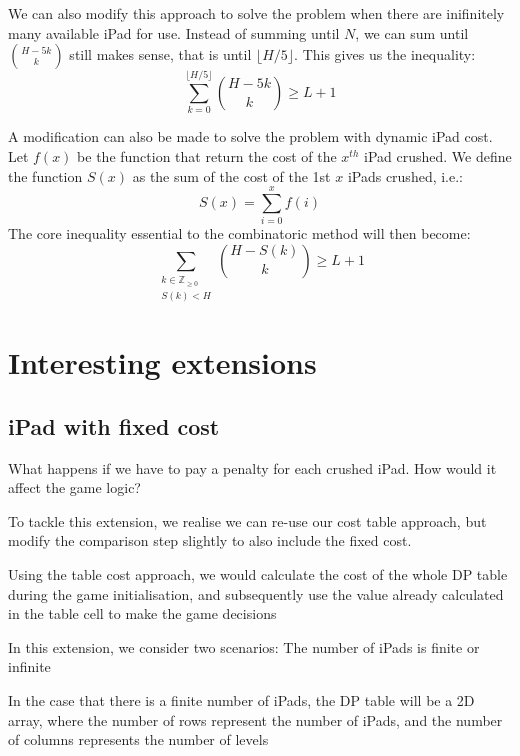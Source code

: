 \documentclass[12pt,a4paper,oneside]{report}
\begin{document}
We can also modify this approach to solve the problem when there are inifinitely many available iPad for use. Instead of summing until $N$, we can sum until ${H-5k \choose k}$ still makes sense, that is until $\lfloor H/5 \rfloor$. This gives us the inequality: \[\sum_{k=0}^{\lfloor H/5 \rfloor} {H-5k \choose k} \geq L+1\]

A modification can also be made to solve the problem with dynamic iPad cost. Let $f(x)$ be the function that return the cost of the $x^{th}$ iPad crushed. We define the function $S(x)$ as the sum of the cost of the 1st $x$ iPads crushed, i.e.: \[S(x) = \sum_{i=0}^x f(i)\] The core inequality essential to the combinatoric method will then become: \[\sum_{\substack{k \in \mathbb{Z}_{\geq 0}\\ S(k) < H}} {H-S(k) \choose k} \geq L+1\]


\chapter{Interesting extensions}
\section{iPad with fixed cost}

What happens if we have to pay a penalty for each crushed iPad. How would it affect the game logic?

To tackle this extension, we realise we can re-use our cost table approach, but modify the comparison step slightly to also include the fixed cost. 

Using the table cost approach, we would calculate the cost of the whole DP table during the game initialisation, and subsequently use the value already calculated in the table cell to make the game decisions

In this extension, we consider two scenarios: The number of iPads is finite or infinite

In the case that there is a finite number of iPads, the DP table will be a 2D array, where the number of rows represent the number of iPads, and the number of columns represents the number of levels
\end{document}
